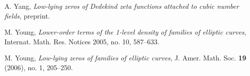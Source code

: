 \documentclass[12pt,reqno]{amsart}
\numberwithin{equation}{section}
\theoremstyle{plain}
\begin{document}
\begin{thebibliography}{GJMMNPPV}
A. Yang, \emph{Low-lying zeros of Dedekind zeta functions attached to cubic number fields}, preprint.

\newblock M. Young, \emph{Lower-order terms of the 1-level density of families of elliptic
curves},  Internat. Math. Res. Notices 2005,  no. 10, 587--633.

\newblock M. Young, \emph{Low-lying zeros of families of elliptic curves},
J. Amer. Math. Soc. \textbf{19} (2006), no. 1, 205--250.

\end{thebibliography}

\ \\
\end{document}
